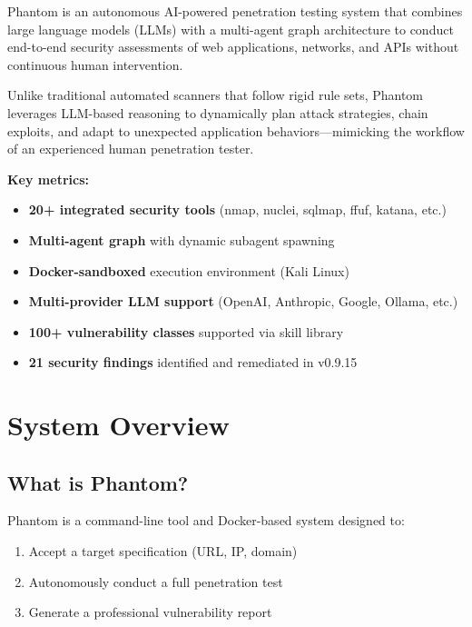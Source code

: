 \documentclass[12pt,a4paper]{article}
\begin{document}
Phantom is an autonomous AI-powered penetration testing system that combines
large language models (LLMs) with a multi-agent graph architecture to conduct
end-to-end security assessments of web applications, networks, and APIs without
continuous human intervention.

Unlike traditional automated scanners that follow rigid rule sets, Phantom
leverages LLM-based reasoning to dynamically plan attack strategies, chain
exploits, and adapt to unexpected application behaviors---mimicking the
workflow of an experienced human penetration tester.

\textbf{Key metrics:}
\begin{itemize}[nosep]
    \item \textbf{20+ integrated security tools} (nmap, nuclei, sqlmap, ffuf, katana, etc.)
    \item \textbf{Multi-agent graph} with dynamic subagent spawning
    \item \textbf{Docker-sandboxed} execution environment (Kali Linux)
    \item \textbf{Multi-provider LLM support} (OpenAI, Anthropic, Google, Ollama, etc.)
    \item \textbf{100+ vulnerability classes} supported via skill library
    \item \textbf{21 security findings} identified and remediated in v0.9.15
\end{itemize}

\section{System Overview}

\subsection{What is Phantom?}

Phantom is a command-line tool and Docker-based system designed to:
\begin{enumerate}[nosep]
    \item Accept a target specification (URL, IP, domain)
    \item Autonomously conduct a full penetration test
    \item Generate a professional vulnerability report
\end{enumerate}
\end{document}
